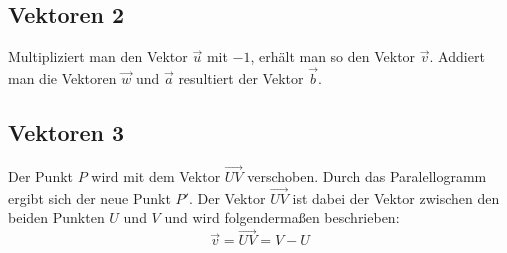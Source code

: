 \documentclass{article}
\begin{document}
    \subsection{Vektoren 2}
    \begin{figure}[h]
        \centering
    \end{figure}
    Multipliziert man den Vektor $\vec{u}$ mit $-1$, erhält man so den Vektor $\vec{v}$.
    Addiert man die Vektoren $\vec{w}$ und $\vec{a}$ resultiert der Vektor $\vec{b}$.

    \newpage

    \subsection{Vektoren 3}
    \begin{figure}[h]
        \centering
    \end{figure}
    Der Punkt $P$ wird mit dem Vektor $\vec{UV}$ verschoben. Durch das Paralellogramm ergibt sich der neue Punkt $P'$. 
    Der Vektor $\vec{UV}$ ist dabei der Vektor zwischen den beiden Punkten $U$ und $V$ und wird folgendermaßen beschrieben:
    \[
        \vec{v} = \vec{UV} = V - U
    \]
\end{document}

